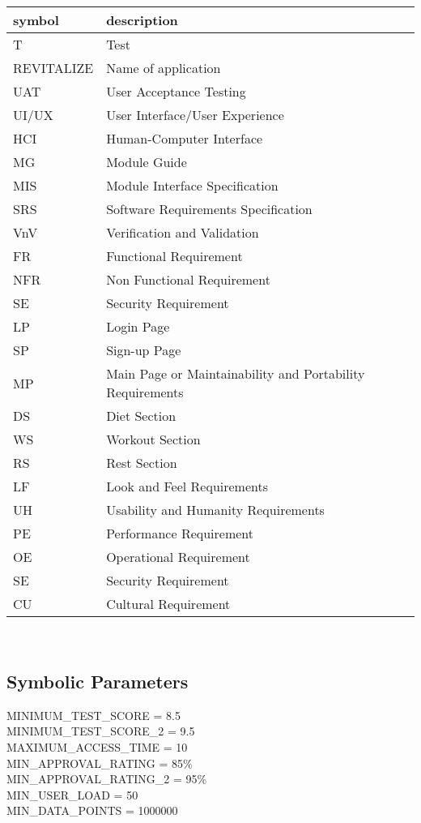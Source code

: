 \documentclass[12pt, titlepage]{article}
\begin{document}
\renewcommand{\arraystretch}{1.2}
\begin{tabular}{l l} 
	\toprule		
	\textbf{symbol} & \textbf{description}\\
	\midrule 
	T & Test\\
	REVITALIZE & Name of application\\
	UAT & User Acceptance Testing\\
	UI/UX & User Interface/User Experience\\
	HCI & Human-Computer Interface\\
	MG & Module Guide\\
	MIS & Module Interface Specification\\
	SRS & Software Requirements Specification\\
	VnV & Verification and Validation\\
	FR & Functional Requirement\\
	NFR & Non Functional Requirement\\
	SE & Security Requirement\\
	LP & Login Page\\
	SP & Sign-up Page\\
	MP & Main Page or Maintainability and Portability Requirements\\
	DS & Diet Section\\
	WS & Workout Section\\
	RS & Rest Section\\
	LF & Look and Feel Requirements\\
	UH & Usability and Humanity Requirements\\
	PE & Performance Requirement\\
	OE & Operational Requirement\\
	SE & Security Requirement\\
	CU & Cultural Requirement\\
	\bottomrule
\end{tabular}\\

\subsection{Symbolic Parameters}

\noindent MINIMUM\_TEST\_SCORE = \hypertarget{MINIMUM_TEST_SCORE}{8.5}\\
MINIMUM\_TEST\_SCORE\_2 = \hypertarget{MINIMUM_TEST_SCORE_2}{9.5}\\
MAXIMUM\_ACCESS\_TIME = \hypertarget{MAXIMUM_ACCESS_TIME}{10}\\
MIN\_APPROVAL\_RATING = \hypertarget{MIN_APPROVAL_RATING}{85\%}\\
MIN\_APPROVAL\_RATING\_2 = \hypertarget{MIN_APPROVAL_RATING_2}{95\%}\\
MIN\_USER\_LOAD = \hypertarget{MIN_USER_LOAD}{50}\\
MIN\_DATA\_POINTS = \hypertarget{MIN_DATA_POINTS}{1000000}
\end{document}
